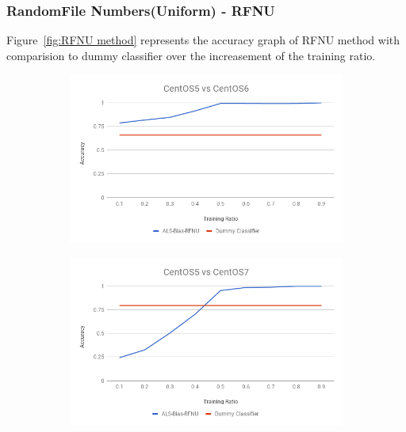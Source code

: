 \documentclass[10pt, conference, compsocconf]{IEEEtran}
\begin{document}
\subsubsection{RandomFile Numbers(Uniform) - RFNU}
Figure~\ref{fig:RFNU method} represents
the accuracy graph of RFNU method with comparision to dummy
classifier over the increasement of the training ratio.
\begin{figure}[h!]
        \centering
        \begin{subfigure}[b]{0.8\linewidth}
                \includegraphics[width=\columnwidth]{figures/ALS-Bias/RFNU-ALS-Bias-5vs6-PFS}
        \end{subfigure}
        \begin{subfigure}[b]{0.8\linewidth}
                \includegraphics[width=\columnwidth]{figures/ALS-Bias/RFNU-ALS-Bias-5vs7-PFS}
        \end{subfigure}
        \begin{subfigure}[b]{0.8\linewidth}

\end{subfigure}
\end{figure}
\end{document}

